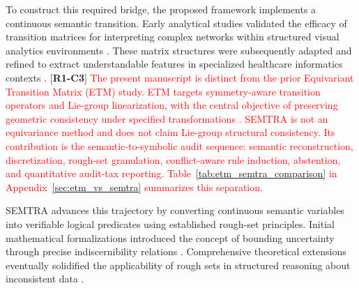 \documentclass[make,article,submit,pdftex,moreauthors]{Definitions/mdpi}
\newcommand{\revtag}[2]{[\textbf{R#1-C#2}]}
\newcommand{\Rone}[1]{\textcolor{red}{#1}}
\begin{document}
To construct this required bridge, the proposed framework implements a continuous semantic transition. Early analytical studies validated the efficacy of transition matrices for interpreting complex networks within structured visual analytics environments \cite{Radiuk2024TransitionMatrix}. These matrix structures were subsequently adapted and refined to extract understandable features in specialized healthcare informatics contexts \cite{Barmak2024TowardTransition}. \revtag{1}{3} \Rone{The present manuscript is distinct from the prior Equivariant Transition Matrix (ETM) study. ETM targets symmetry-aware transition operators and Lie-group linearization, with the central objective of preserving geometric consistency under specified transformations \cite{Radiuk2026EquivariantTransition}. SEMTRA is not an equivariance method and does not claim Lie-group structural consistency. Its contribution is the semantic-to-symbolic audit sequence: semantic reconstruction, discretization, rough-set granulation, conflict-aware rule induction, abstention, and quantitative audit-tax reporting. Table~\ref{tab:etm_semtra_comparison} in Appendix~\ref{sec:etm_vs_semtra} summarizes this separation.} 

SEMTRA advances this trajectory by converting continuous semantic variables into verifiable logical predicates using established rough-set principles. Initial mathematical formalizations introduced the concept of bounding uncertainty through precise indiscernibility relations \cite{Pawlak1982RoughSets}. Comprehensive theoretical extensions eventually solidified the applicability of rough sets in structured reasoning about inconsistent data \cite{Pawlak1991RoughSets}. 
\end{document}
